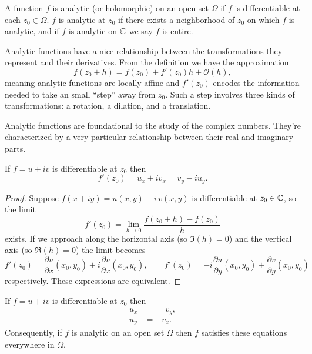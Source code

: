 \documentclass[../m136main.tex]{subfiles}
\begin{document}
\begin{definition}[Analytic]
    A function $f$ is analytic (or holomorphic) on an open set $\Omega$ if $f$ is differentiable at each $z_0 \in \Omega$.
    $f$ is analytic at $z_0$ if there exists a neighborhood of $z_0$ on which $f$ is analytic, and if $f$ is analytic on $\mathbb{C}$ we say $f$ is entire.
\end{definition}

Analytic functions have a nice relationship between the transformations they represent and their derivatives.
From the definition we have the approximation
\[ f(z_0 + h) = f(z_0) + f'(z_0) h + \mathcal O (h), \]
meaning analytic functions are locally affine and $f'(z_0)$ encodes the information needed to take an small ``step'' away from $z_0$.
Such a step involves three kinds of transformations: a rotation, a dilation, and a translation.

Analytic functions are foundational to the study of the complex numbers.
They're characterized by a very particular relationship between their real and imaginary parts.

\begin{lemma}[]
    If $f = u + iv$ is differentiable at $z_0$ then
    \[ f'(z_0) = u_x + iv_x = v_y - i u_y. \]
\end{lemma}

\begin{proof}
    Suppose $f(x + iy) = u(x,y) + i \, v(x,y)$ is differentiable at $z_0 \in \mathbb{C}$, so the limit
    \[ f'(z_0) = \lim_{h \to 0} \frac{f(z_0 + h) - f(z_0)}{h} \]
    exists.
    If we approach along the horizontal axis (so $\Im(h) = 0$) and the vertical axis (so $\Re(h) = 0$) the limit becomes
    \[ f'(z_0) = \frac{\partial u}{\partial x}(x_0, y_0) + i \frac{\partial v}{\partial x}(x_0, y_0), \qquad f'(z_0) = -i \frac{\partial u}{\partial y}(x_0, y_0) + \frac{\partial v}{\partial y}(x_0, y_0) \]
    respectively.
    These expressions are equivalent.
\end{proof}

\begin{theorem}
    If $f = u + iv$ is differentiable at $z_0$ then \vspace{-8pt}
    \begin{align*}
        u_x &= \phantom{-}v_y, \\
        u_y &= -v_x.
    \end{align*}
    Consequently, if $f$ is analytic on an open set $\Omega$ then $f$ satisfies these equations everywhere in $\Omega$.
\end{theorem}
\end{document}
